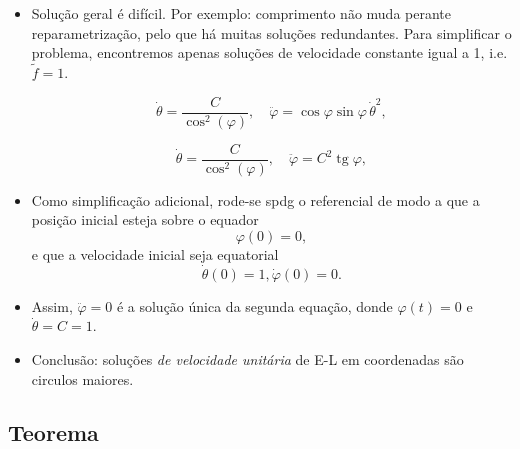\documentclass{article}
\theoremstyle{plain}
\theoremstyle{plain}
\theoremstyle{nonumberplain}
\theoremstyle{empty}
\DeclareMathOperator{\tg}{tg}
\begin{document}
\begin{itemize}
\item Solução geral é difícil. Por exemplo: comprimento não muda perante reparametrização, pelo que há muitas soluções redundantes. Para simplificar o problema, encontremos apenas soluções de velocidade constante igual a 1, i.e. $\tilde f = 1$.

\[\dot \theta = \frac C {\cos^2(\varphi)}, \quad \ddot \varphi = \cos\varphi \sin\varphi \, \dot \theta^2,\]

\[\dot \theta = \frac C {\cos^2(\varphi)}, \quad \ddot \varphi = C^2 \tg \varphi,\]

\item Como simplificação adicional, rode-se spdg o referencial de modo a que a posição inicial esteja sobre o equador
\[\varphi(0) = 0,\]
e que a velocidade inicial seja equatorial
\[\dot \theta(0) = 1, \dot \varphi(0) = 0.\]

\item Assim, $\ddot \varphi = 0$ é a solução única da segunda equação, donde $\varphi(t) = 0$ e $\dot \theta = C = 1$.

\item Conclusão: soluções \emph{de velocidade unitária} de E-L em coordenadas são circulos maiores.
\end{itemize}

\subsection{Teorema}
\end{document}
